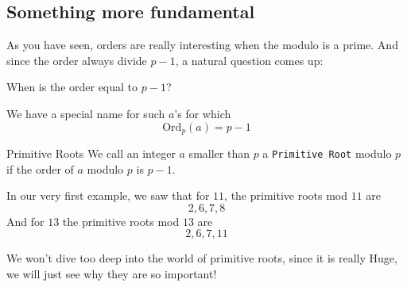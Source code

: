 \documentclass[compress]{beamer}
\newcommand{\gap}{\pause\vspace{1em}}
\begin{document}
\subsection{Something more fundamental}

\begin{frame}
    As you have seen, orders are really interesting when the modulo is a
    prime. And since the order always divide $p-1$, a natural question comes
    up:

    \gap

    \textcolor{NordRed}{When is the order equal to $p-1$?}

    \gap

    We have a special name for such $a$'s for which 
    \[\text{Ord}_p(a) = p-1\] 
\end{frame}

\begin{frame}{Primitive Roots}
    \textcolor{NordRed}{We call an integer $a$ smaller than $p$ a
    \texttt{Primitive Root} modulo $p$ if the order of $a$ modulo $p$ is $p-1$.}

    \gap

    In our very first example, we saw that for $11$, the primitive roots mod
    $11$ are 
    \[2, 6, 7, 8\]\pause
    And for $13$ the primitive roots mod $13$ are
    \[2, 6, 7, 11\] 

    \pause

    We won't dive too deep into the world of primitive roots, since it is
    really Huge, we will just see why they are so important!
\end{frame}
\end{document}
